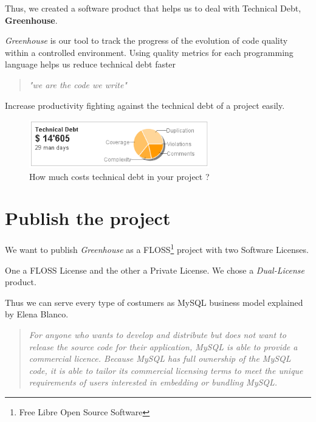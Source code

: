 \documentclass[11pt]{scrartcl}
\begin{document}
\par Thus, we created a software product that helps us to deal with Technical Debt, \textbf{Greenhouse}.

\par \emph{Greenhouse} is our tool to track the progress of the evolution of code quality within a controlled environment. Using quality metrics for each programming language helps us reduce technical debt faster

\begin{quote}
    \begin{center}
    \emph{"we are the code we write"}
    \end{center}
\end{quote}

\par Increase productivity fighting against the technical debt of a project easily.

\begin{figure}[H]
\centering
\includegraphics[width=0.7\textwidth]{sonar_technical_debt.png}
\caption{How much costs technical debt in your project ?}
\label{tech-debt-costs}
\end{figure}

\section{Publish the project}
\label{sec:publish-project}

\par We want to publish \emph{Greenhouse} as a FLOSS\footnote{Free Libre Open Source Software} project with two Software Licenses.

\par One a FLOSS License and the other a Private License. We chose a \emph{Dual-License} product.

\par Thus we can serve every type of costumers as MySQL business model explained by Elena Blanco\cite{dl-business-model}.

\begin{quotation}
    \emph{For anyone who wants to develop and distribute but does not want to release the source code for their application, MySQL is able to provide a commercial licence. Because MySQL has full ownership of the MySQL code, it is able to tailor its commercial licensing terms to meet the unique requirements of users interested in embedding or bundling MySQL.}
\end{quotation}
\end{document}
